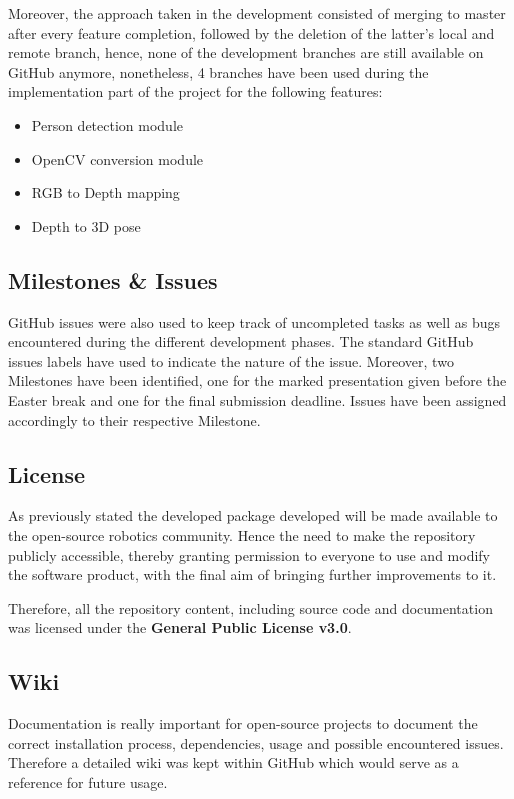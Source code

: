 Moreover, the approach taken in the development consisted of merging to master after every feature completion, followed by the deletion of the latter's local and remote branch, hence, none of the development branches are still available on GitHub anymore, nonetheless, 4 branches have been used during the implementation part of the project for the following features:

\begin{itemize}
  \item Person detection module
  \item OpenCV conversion module
  \item RGB to Depth mapping
  \item Depth to 3D pose
\end{itemize}

\subsection{Milestones \& Issues}

GitHub issues were also used to keep track of uncompleted tasks as well as bugs encountered during the different development phases. The standard GitHub issues labels have used to indicate the nature of the issue. Moreover, two Milestones have been identified, one for the marked presentation given before the Easter break and one for the final submission deadline. Issues have been assigned accordingly to their respective Milestone.

\subsection{License}

As previously stated the developed package developed will be made available to the open-source robotics community. Hence the need to make the repository publicly accessible, thereby granting permission to everyone to use and modify the software product, with the final aim of bringing further improvements to it.

Therefore, all the repository content, including source code and documentation was licensed under the \textbf{General Public License v3.0}.

\subsection{Wiki}

Documentation is really important for open-source projects to document the correct installation process, dependencies, usage and possible encountered issues. Therefore a detailed wiki was kept within GitHub which would serve as a reference for future usage.